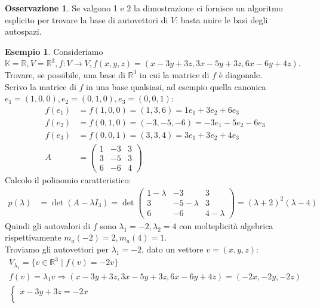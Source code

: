 \documentclass[a4paper]{article}
\theoremstyle{definition}
\newtheorem*{oss}{Osservazione}
\newtheorem*{es}{Esempio}
\begin{document}
	\begin{oss}
		Se valgono 1 e 2 la dimostrazione ci fornisce un algoritmo esplicito per trovare la base di autovettori di $V$: basta unire le basi degli autospazi.
	\end{oss}

	\begin{es}
		Consideriamo $\mathbb{K} = \mathbb{R}, V = \mathbb{R}^3, f: V \to V, f(x, y, z) = (x - 3y + 3z, 3x - 5y + 3z, 6x - 6y + 4z)$. \\
		Trovare, se possibile, una base di $\mathbb{R}^3$ in cui la matrice di $f$ è diagonale. \\
		Scrivo la matrice di $f$ in una base qualsiasi, ad esempio quella canonica $e_1 = (1, 0, 0), e_2 = (0, 1, 0), e_3 = (0, 0, 1)$:
		\begin{align*}
			f(e_1) &= f(1, 0, 0) = (1, 3, 6) = 1e_1 + 3e_2 + 6e_3 \\
			f(e_2) &= f(0, 1, 0) = (-3, -5, -6) = -3e_1 - 5e_2 - 6e_3 \\
			f(e_3) &= f(0, 0, 1) = (3, 3, 4) = 3e_1 + 3e_2 + 4e_3 \\
			A &= \begin{pmatrix}
				1 & -3 & 3 \\
				3 & -5 & 3 \\
				6 & -6 & 4
			\end{pmatrix}
		\end{align*}
		Calcolo il polinomio caratteristico:
		\begin{align*}
			p(\lambda) &= \det(A - \lambda I_3) = \det \begin{pmatrix}
				1 - \lambda & -3 & 3 \\
				3 & -5 - \lambda & 3 \\
				6 & -6 & 4 - \lambda
			\end{pmatrix} = (\lambda + 2)^2(\lambda - 4)
		\end{align*}
		Quindi gli autovalori di $f$ sono $\lambda_1 = -2, \lambda_2 = 4$ con molteplicità algebrica rispettivamente $m_a(-2) = 2, m_a(4) = 1$. \\
		Troviamo gli autovettori per $\lambda_1 = -2$, dato un vettore $v = (x, y, z)$:
		\begin{align*}
			V_{\lambda_1} = \{v \in \mathbb{R}^3 \mid f(v) = -2v\} \\
			f(v) = \lambda_1 v \Rightarrow (x - 3y + 3z, 3x - 5y + 3z, 6x - 6y + 4z) = (-2x, -2y, -2z) \\
			\begin{cases}
				x - 3y + 3z = -2x \\

\end{cases}
\end{align*}
\end{es}
\end{document}
